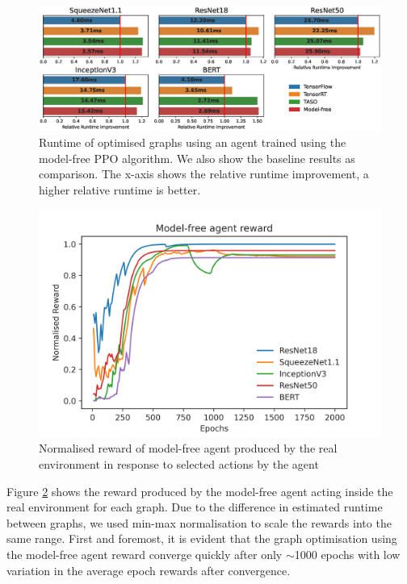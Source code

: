 \begin{figure}[h]
  \centering
  \includegraphics[width=1\columnwidth]{sections/5evaluation/images/runtimes_mf_h}
  \caption[Runtimes of optimised graphs using MF-RL]{Runtime of optimised graphs using an agent trained using the model-free PPO algorithm. We also show the baseline results as comparison. The x-axis shows the relative runtime improvement, a higher relative runtime is better.}
  \label{fig:eval:mf-agent-runtimes}
\end{figure}

\begin{figure}[h]
  \centering
  \includegraphics[width=1\columnwidth]{sections/5evaluation/images/mf_training_reward}
  \caption[Epoch reward during training of model-free agent]{Normalised reward of model-free agent produced by the real environment in response to selected actions by the agent}
  \label{fig:eval:mf-agent-reward}
\end{figure}

Figure \ref{fig:eval:mf-agent-reward} shows the reward produced by the model-free agent acting inside the real environment for each graph. Due to the difference in estimated runtime between graphs, we used min-max normalisation to scale the rewards into the same range. First and foremost, it is evident that the graph optimisation using the model-free agent reward converge quickly after only $\sim$1000 epochs with low variation in the average epoch rewards after convergence.

